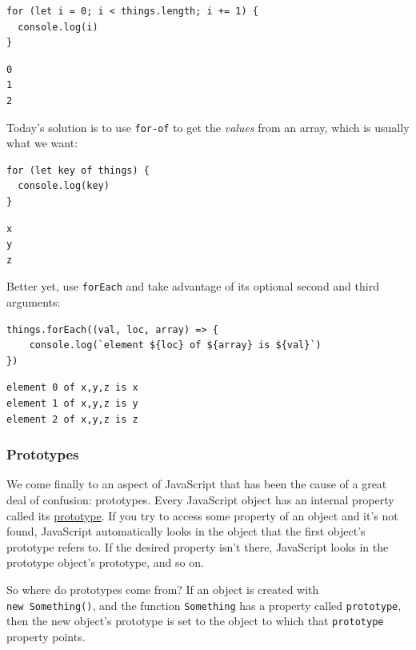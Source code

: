 \begin{verbatim}
for (let i = 0; i < things.length; i += 1) {
  console.log(i)
}
\end{verbatim}

\begin{verbatim}
0
1
2
\end{verbatim}

Today's solution is to use \texttt{for-of} to get the \emph{values} from
an array, which is usually what we want:

\begin{verbatim}
for (let key of things) {
  console.log(key)
}
\end{verbatim}

\begin{verbatim}
x
y
z
\end{verbatim}

Better yet, use \texttt{forEach} and take advantage of its optional
second and third arguments:

\begin{verbatim}
things.forEach((val, loc, array) => {
    console.log(`element ${loc} of ${array} is ${val}`)
})
\end{verbatim}

\begin{verbatim}
element 0 of x,y,z is x
element 1 of x,y,z is y
element 2 of x,y,z is z
\end{verbatim}

\hypertarget{s:legacy-prototypes}{\subsubsection{Prototypes}\label{s:legacy-prototypes}}

We come finally to an aspect of JavaScript that has been the cause of a
great deal of confusion: prototypes. Every JavaScript object has an
internal property called its \protect\hyperlink{g:prototype}{prototype}.
If you try to access some property of an object and it's not found,
JavaScript automatically looks in the object that the first object's
prototype refers to. If the desired property isn't there, JavaScript
looks in the prototype object's prototype, and so on.

So where do prototypes come from? If an object is created with
\texttt{new\ Something()}, and the function \texttt{Something} has a
property called \texttt{prototype}, then the new object's prototype is
set to the object to which that \texttt{prototype} property points.

